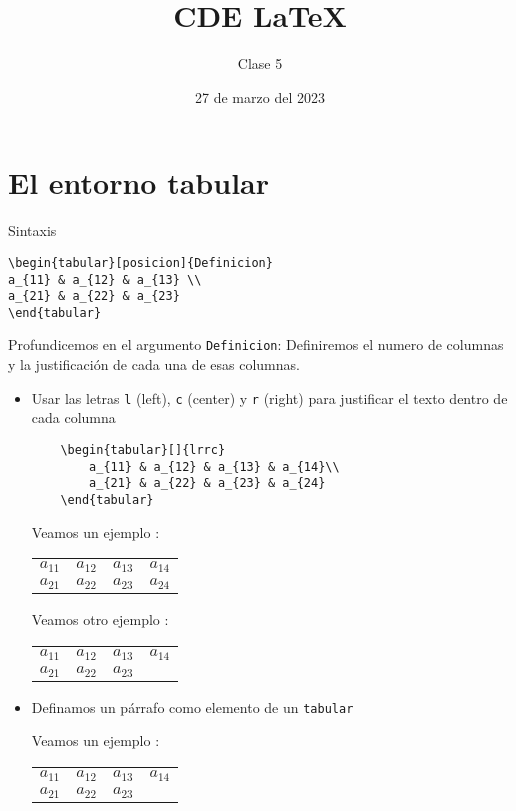 \documentclass{article}
\title{CDE \LaTeX}
\author{Clase 5}
\date{27 de marzo del 2023}
\begin{document}
\maketitle

\begin{abstract}
	\lipsum[2]
\end{abstract}

\section{El entorno tabular}
\noindent Sintaxis

\begin{verbatim}
\begin{tabular}[posicion]{Definicion}
a_{11} & a_{12} & a_{13} \\
a_{21} & a_{22} & a_{23}
\end{tabular}
\end{verbatim}

Profundicemos en el argumento \verb*|Definicion|:
Definiremos el numero de columnas y la justificación de cada una de esas columnas.
\begin{itemize}
\item Usar las letras \verb*|l| (left), \verb*|c| (center) y \verb*|r| (right) para justificar el texto dentro de cada columna
\begin{verbatim}
	\begin{tabular}[]{lrrc}
		a_{11} & a_{12} & a_{13} & a_{14}\\
		a_{21} & a_{22} & a_{23} & a_{24}
	\end{tabular}
\end{verbatim}

Veamos un ejemplo :

\begin{tabular}[]{lrrc}
	$a_{11}$ & $a_{12}$ & $a_{13}$ & $a_{14}$\\
	$a_{21}$ & $a_{22}$ & $a_{23}$ & $a_{24}$
\end{tabular}

Veamos otro ejemplo :

\begin{tabular}[]{lrrc}
	$a_{11}$ & $a_{12}$ & $a_{13}$ & $a_{14}$\\
	$a_{21}$ & $a_{22}$ & $a_{23}$ & \lipsum[2]
\end{tabular}


\item Definamos un párrafo como elemento de un \verb*|tabular|

Veamos un ejemplo : 

\begin{tabular}[]{lrrp{9cm}}
	$a_{11}$ & $a_{12}$ & $a_{13}$ & $a_{14}$\\
	$a_{21}$ & $a_{22}$ & $a_{23}$ & \lipsum[2]
\end{tabular}




\end{itemize}
\end{document}
